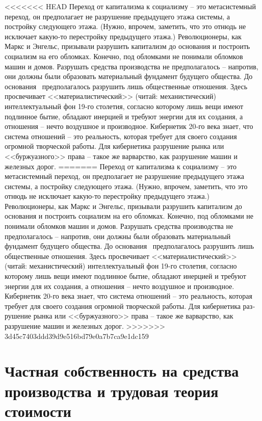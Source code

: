 \documentclass{book}
\begin{document}
<<<<<<< HEAD
Переход от капитализма к социализму -- это метасистемный переход, он предполагает не разрушение предыдущего этажа системы, а постройку следующего этажа. (Нужно, впрочем, заметить, что это отнюдь не исключает какую‑то перестройку предыдущего этажа.) Революционеры, как Маркс и Энгельс, призывали разрушить капитализм до основания и построить социализм на его обломках. Конечно, под обломками не пони­мали обломков машин и домов. Разрушать средства произ­водства не предполагалось -- напротив, они должны были обра­зовать материальный фундамент будущего общества. До осно­вания  предполагалось разрушить лишь общественные отно­шения. Здесь просвечивает <<материалистический>> (читай: меха­нистический) интеллектуальный фон 19‑го столетия, согласно которому лишь вещи имеют подлинное бытие, обладают инер­цией и требуют энергии для их создания, а отношения -- нечто воздушное и производное. Кибернетик 20‑го века знает, что система отношений -- это реальность, которая требует для своего создания огромной творческой работы. Для кибернетика раз­рушение рынка или <<буржуазного>> права -- такое же варварст­во, как разрушение машин и железных дорог.
=======
Переход от капитализма к социализму -- это метасистемный переход, он предполагает не разрушение предыдущего этажа системы, а постройку следующего этажа. (Нужно, впрочем, заметить, что это отнюдь не исключает какую-то перестройку предыдущего этажа.) Революционеры, как Маркс и Энгельс, призывали разрушить капитализм до основания и построить социализм на его обломках. Конечно, под обломками не пони­мали обломков машин и домов. Разрушать средства произ­водства не предполагалось -- напротив, они должны были обра­зовать материальный фундамент будущего общества. До осно­вания  предполагалось разрушить лишь общественные отно­шения. Здесь просвечивает <<материалистический>> (читай: меха­нистический) интеллектуальный фон 19-го столетия, согласно которому лишь вещи имеют подлинное бытие, обладают инер­цией и требуют энергии для их создания, а отношения -- нечто воздушное и производное. Кибернетик 20-го века знает, что система отношений -- это реальность, которая требует для своего создания огромной творческой работы. Для 
кибернетика раз­рушение рынка или <<буржуазного>> права -- такое же варварст­во, как разрушение машин и железных дорог.
>>>>>>> 3d45c7403ddd39d9e516bd79e0a7b7ca9e1dc159



\section{Частная собственность на средства производства и трудовая теория стоимости}
\end{document}
